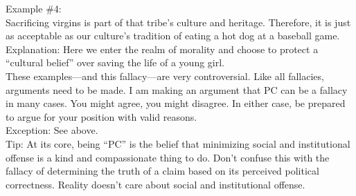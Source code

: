\documentclass[a4paper,12pt,single,pdftex]{scrbook}
\begin{document}
    
      Example \#4:
    \\

    
      Sacrificing virgins is part of that tribe's culture and heritage.  Therefore, it is just as acceptable as our culture’s tradition of eating a hot dog at a baseball game.
    \\

    
      Explanation: Here we enter the realm of morality and choose to protect a “cultural belief” over saving the life of a young girl. 
    \\

    
      These examples—and this fallacy—are very controversial.  Like all fallacies, arguments need to be made.  I am making an argument that PC can be a fallacy in many cases.  You might agree, you might disagree.  In either case, be prepared to argue for your position with valid reasons.
    \\

    
      Exception: See above.
    \\

    
      Tip: At its core, being “PC” is the belief that minimizing social and institutional offense is a kind and compassionate thing to do. Don’t confuse this with the fallacy of determining the truth of a claim based on its perceived political correctness. Reality doesn’t care about social and institutional offense.
    \\
\end{document}
